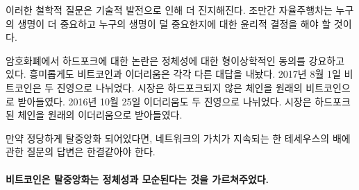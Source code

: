 이러한 철학적 질문은 기술적 발전으로 인해 더 진지해진다. 
조만간 자율주행차는 누구의 생명이 더 중요하고 누구의 생명이 덜 중요한지에 대한
윤리적 결정을 해야 할 것이다.

암호화폐에서 하드포크에 대한 논란은 정체성에 대한 형이상학적인 동의를 강요하고 있다. 
흥미롭게도 비트코인과 이더리움은 각각 다른 대답을 내놨다. 2017년 8월 1일 비트코인은 두 진영으로 
나뉘었다. 시장은 하드포크되지 않은 체인을 원래의 비트코인으로 받아들였다. 
2016년 10월 25일 이더리움도 두 진영으로 나뉘었다.
시장은 하드포크된 체인을 원래의 이더리움으로 받아들였다.

만약 정당하게 탈중앙화 되어있다면, 네트워크의 가치가 지속되는 한 테세우스의 배에 관한 질문의 
답변은 한결같아야 한다.

\paragraph{비트코인은 탈중앙화는 정체성과 모순된다는 것을 가르쳐주었다.}

%
%
%
%
